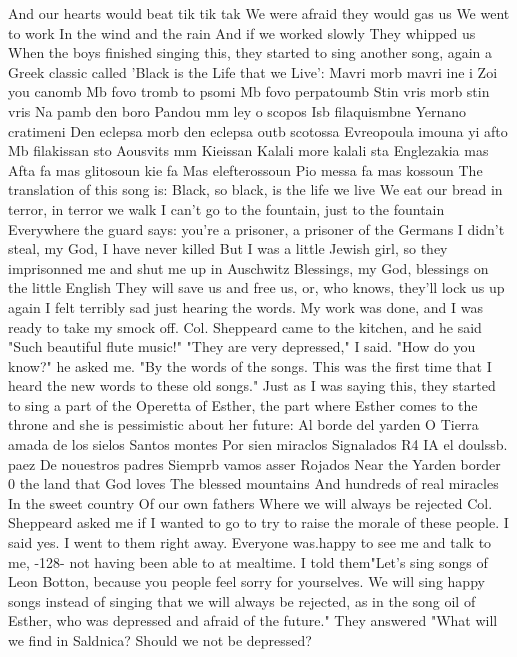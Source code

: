 And our hearts would beat tik tik tak 
We were afraid they would gas us 
We went to work 
In the wind and the rain 
And if we worked slowly 
They whipped us 
When the boys finished singing this, they started to sing another song, again a 
Greek classic called 'Black is the Life that we Live': 
Mavri morb mavri ine i Zoi you canomb 
Mb fovo tromb to psomi 
Mb fovo perpatoumb 
Stin vris morb stin vris 
Na pamb den boro 
Pandou mm ley o scopos 
Isb filaquismbne 
Yernano cratimeni 
Den eclepsa morb den eclepsa 
outb scotossa 
Evreopoula imouna yi afto 
Mb filakissan sto 
Aousvits mm Kieissan 
Kalali more kalali sta 
Englezakia mas 
Afta fa mas glitosoun kie fa 
Mas elefterossoun 
Pio messa fa mas kossoun 
The translation of this song is: 
Black, so black, is the life we live 
We eat our bread in terror, in terror we walk 
I can't go to the fountain, just to the fountain 
Everywhere the guard says: you're a prisoner, a 
prisoner of the Germans 
I didn't steal, my God, I have never killed 
But I was a little Jewish girl, so they imprisonned me 
and shut me up in Auschwitz 
Blessings, my God, blessings on the little English 
They will save us and free us, or, who knows, they'll 
lock us up again 
I felt terribly sad just hearing the words.
My work was done, and I was ready to 
take my smock off.
Col.
Sheppeard came to the kitchen, and he said "Such beautiful 
flute music!"
"They are very depressed," I said.
"How do you know?"
he asked me.
"By the words of the songs.
This was the first time that I heard the new words 
to these old songs."
Just as I was saying this, they started to sing a part of the 
Operetta of Esther, the part where Esther comes to the throne and she is pessimistic 
about her future: 
Al borde del yarden 
O Tierra amada de los sielos 
Santos montes 
Por sien miraclos 
Signalados 
R4 IA el doulssb.
paez 
De nouestros padres 
Siemprb vamos asser 
Rojados 
Near the Yarden border 
0 the land that God loves 
The blessed mountains 
And hundreds of real miracles 
In the sweet country 
Of our own fathers 
Where we will always be rejected 
Col.
Sheppeard asked me if I wanted to go to try to raise the morale of these people.
I said yes.
I went to them right away.
Everyone was.happy to see me and talk to me, 
-128- 
not having been able to at mealtime.
I told them"Let's sing songs of Leon Botton, 
because you people feel sorry for yourselves.
We will sing happy songs instead of 
singing that we will always be rejected, as in the song oil of Esther, who was depressed 
and afraid of the future."
They answered "What will we find in Saldnica?
Should we 
not be depressed?
